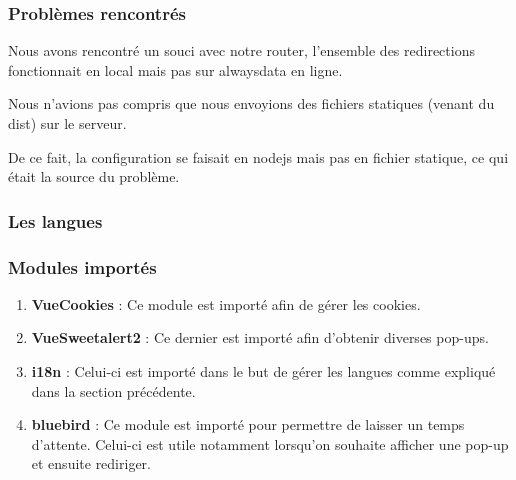 \subsubsection{Problèmes rencontrés}
\begin{flushleft}
Nous avons rencontré un souci avec notre router, l’ensemble des redirections fonctionnait en local mais pas sur alwaysdata en ligne.
\end{flushleft}
\begin{flushleft}
Nous n’avions pas compris que nous envoyions des fichiers statiques (venant du dist) sur le serveur.
\end{flushleft}
\begin{flushleft}
De ce fait, la configuration se faisait en nodejs mais pas en fichier statique, ce qui était la source du problème.
\end{flushleft}

\subsubsection{Les langues}

\subsubsection{Modules importés}
\begin{enumerate}[-]
\item \textbf{VueCookies} :\newline
Ce module est importé afin de gérer les cookies.
\item \textbf{VueSweetalert2} :\newline
Ce dernier est importé afin d'obtenir diverses pop-ups.
\item \textbf{i18n} :\newline
Celui-ci est importé dans le but de gérer les langues comme expliqué dans la section précédente.
\item \textbf{bluebird} :\newline
Ce module est importé pour permettre de laisser un temps d'attente.
Celui-ci est utile notamment lorsqu'on souhaite afficher une pop-up et ensuite rediriger.
\end{enumerate} 
